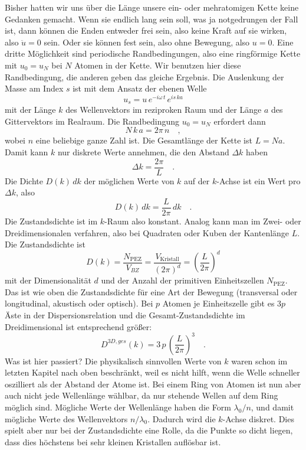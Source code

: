 Bisher hatten wir uns über die Länge unsere ein- oder mehratomigen Kette keine Gedanken gemacht. Wenn sie endlich lang sein soll, was ja notgedrungen der Fall ist, dann können die Enden entweder frei sein, also keine Kraft auf sie wirken, also $\ddot{u} = 0$ sein. Oder sie können fest sein, also ohne Bewegung, also $u=0$. Eine dritte Möglichkeit sind periodische Randbedingungen, also eine ringförmige Kette mit $u_0 = u_N$ bei $N$ Atomen in der Kette. Wir benutzen hier diese Randbedingung, die anderen geben das gleiche Ergebnis. Die Auslenkung der Masse am Index $s$ ist mit dem Ansatz der ebenen Welle
\begin{equation}
 u_s = u \, e^{- i \omega \, t} \, e^{i s \, k a}
\end{equation}
mit der Länge $k$ des Wellenvektors im reziproken Raum und der Länge $a$ des  Gittervektors  im  Realraum. Die Randbedingung $u_0 = u_N$ erfordert dann
\begin{equation}
 N \, k \, a = 2 \pi \, n \quad ,
\end{equation}
wobei $n$ eine beliebige ganze Zahl ist.
Die Gesamtlänge der Kette ist $L = N a$. Damit kann $k$ nur diskrete Werte annehmen, die den Abstand $\Delta k$ haben
\begin{equation}
\Delta  k = \frac{2 \pi }{L}  \quad .
\end{equation}
Die Dichte $ D(k) \, dk$ der möglichen Werte von $k$ auf der $k$-Achse ist ein Wert pro $\Delta k$, also
\begin{equation}
 D(k) \, dk = \frac{L}{2 \pi} \, dk  \quad .
\end{equation}
Die Zustandsdichte ist im $k$-Raum also konstant.
Analog kann man im Zwei- oder Dreidimensionalen verfahren, also bei Quadraten oder Kuben der Kantenlänge $L$. Die Zustandsdichte ist
\begin{equation}
D(k) = \frac{N_\text{PEZ}}{V_{BZ}}  = 
\frac{V_\text{Kristall}} {(2 \pi)^d} =
 \left(\frac{L}{2 \pi} \right)^d 
\end{equation}
mit der Dimensionalität $d$ und der Anzahl der primitiven Einheitszellen $N_\text{PEZ}$. Das ist wie oben die Zustandsdichte für eine Art der Bewegung (transversal oder longitudinal, akustisch oder optisch). Bei $p$ Atomen je Einheitszelle gibt es $3p$ Äste in der Dispersionsrelation und die Gesamt-Zustandsdichte im Dreidimensional ist entsprechend größer:
\begin{equation}
  D^{3D, ges}(k) =  3 \, p \,   \left(\frac{L}{2 \pi} \right)^3 \quad .
  \end{equation}
Was ist hier passiert? Die physikalisch sinnvollen Werte von $k$ waren schon im letzten Kapitel nach oben beschränkt, weil es nicht hilft, wenn die Welle schneller oszilliert als der Abstand der Atome ist. Bei einem Ring von Atomen ist nun aber auch nicht jede Wellenlänge wählbar, da nur stehende Wellen auf dem Ring möglich sind. Mögliche Werte der Wellenlänge haben die Form $\lambda_0 / n$, und damit mögliche Werte des Wellenvektors $n / \lambda_0$. Dadurch wird die $k$-Achse diskret. Dies spielt aber nur bei der Zustandsdichte eine Rolle, da die Punkte so dicht liegen, dass dies höchstens bei sehr kleinen Kristallen auflösbar ist.

